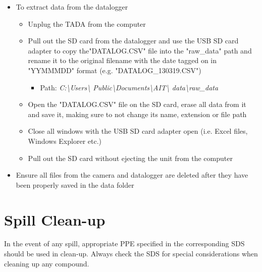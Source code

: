 \documentclass[letterpaper,11pt]{article}
\begin{document}
\begin{itemize}
    \item To extract data from the datalogger
        \begin{itemize}
        \item Unplug the TADA from the computer
        \item Pull out the SD card from the datalogger and use the USB SD card 
            adapter to copy the"DATALOG.CSV" file into the "raw\_data" path and 
            rename it to the original filename with the date 
            tagged on in "YYMMMDD" format (e.g. "DATALOG\_130319.CSV")
            \begin{itemize}
            \item Path: \textit{C:\textbackslash Users\textbackslash 
            Public\textbackslash Documents\textbackslash AIT\textbackslash 
            data\textbackslash raw\_data}
            \end{itemize}
        \item Open the "DATALOG.CSV" file on the SD card, erase all data from
            it and save it, making sure to not change its name, extension or 
            file path
        \item Close all windows with the USB SD card adapter open (i.e. Excel 
            files, Windows Explorer etc.)
        \item Pull out the SD card without ejecting the unit from the computer
        \end{itemize}
    
    \item Ensure all files from the camera and datalogger are deleted after they
        have been properly saved in the data folder 
            
    \end{itemize}

\newpage
\section{Spill Clean-up}
In the event of any spill, appropriate PPE specified in the corresponding SDS 
    should be used in clean-up. Always check the SDS for special considerations
    when cleaning up any compound.
\end{document}
